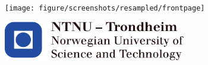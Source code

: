 \pagestyle{empty}

\noindent

\begin{center}
    \huge\bfseries
     	\projecttitle 
\end{center}

\vfill
\begin{center}
    \Large
    	\course
\end{center}

\begin{center}
\texttt{[image: figure/screenshots/resampled/frontpage]}
\end{center}

\vfill
\begin{center}
    \Large
    	\me 
\end{center}

\vfill
\begin{center}
   \includegraphics[width=8cm]{figure/ntnulogo_english}
	\vfill
	\Large\bfseries
		\period
\end{center}

\cleardoublepage

